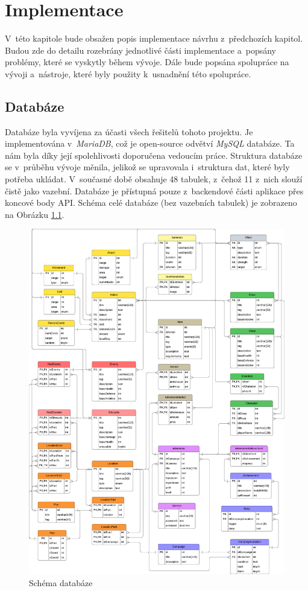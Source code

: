 \chapter{Implementace}
V~této kapitole bude obsažen popis implementace návrhu z~předchozích kapitol. Budou zde do detailu rozebrány jednotlivé části implementace a~popsány problémy, které se vyskytly během vývoje. Dále bude popsána spolupráce na vývoji a~nástroje, které byly použity k~usnadnění této spolupráce.

\section{Databáze}
Databáze byla vyvíjena za účasti všech řešitelů tohoto projektu. Je implementována v~\textit{MariaDB}, což je open-source odvětví \textit{MySQL} databáze. Ta nám byla díky její spolehlivosti doporučena vedoucím práce. Struktura databáze se v~průběhu vývoje měnila, jelikož se upravovala i~struktura dat, které byly potřeba ukládat. V~současné době obsahuje 48 tabulek, z~čehož 11 z~nich slouží čistě jako vazební. Databáze je přístupná pouze z~backendové části aplikace přes koncové body API. Schéma celé databáze (bez vazebních tabulek) je zobrazeno na Obrázku \ref{fig:db_schema}.

\begin{figure}[htbp]
  \centering
  \includegraphics[width=.95\textwidth]{../../shared/diagrams/dbScheme.pdf}
  \caption{Schéma databáze}
  \label{fig:db_schema}
\end{figure}

